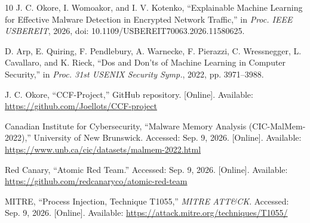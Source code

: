 \documentclass[conference]{IEEEtran}
\begin{document}
\begin{thebibliography}{10}
 J. C. Okore, I. Womoakor, and I. V. Kotenko,
``Explainable Machine Learning for Effective Malware Detection in Encrypted
Network Traffic,'' in \textit{Proc. IEEE USBEREIT}, 2026,
doi: 10.1109/USBEREIT70063.2026.11580625.

 D. Arp, E. Quiring, F. Pendlebury, A. Warnecke,
F. Pierazzi, C. Wressnegger, L. Cavallaro, and K. Rieck,
``Dos and Don'ts of Machine Learning in Computer Security,'' in
\textit{Proc. 31st USENIX Security Symp.}, 2022, pp. 3971--3988.

 J. C. Okore, ``CCF-Project,'' GitHub repository.
[Online]. Available:
\url{https://github.com/Joellots/CCF-project}

 Canadian Institute for Cybersecurity,
``Malware Memory Analysis (CIC-MalMem-2022),'' University of New Brunswick.
Accessed: Sep. 9, 2026. [Online]. Available:
\url{https://www.unb.ca/cic/datasets/malmem-2022.html}

 Red Canary, ``Atomic Red Team.''
Accessed: Sep. 9, 2026. [Online]. Available:
\url{https://github.com/redcanaryco/atomic-red-team}

 MITRE, ``Process Injection, Technique T1055,''
\textit{MITRE ATT\&CK}.
Accessed: Sep. 9, 2026. [Online]. Available:
\url{https://attack.mitre.org/techniques/T1055/}

\end{thebibliography}
\end{document}
